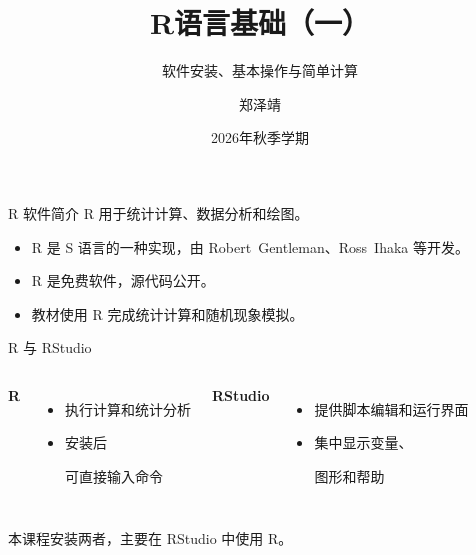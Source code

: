 \documentclass[14pt,compress,t,noamsthm,notheorem,table,handout,fontset=none]{ctexbeamer}
\title{R语言基础（一）}
\subtitle{软件安装、基本操作与简单计算}
\author{郑泽靖}
\institute{北京师范大学统计学院}
\date{2026年秋季学期}
\begin{document}
\begin{frame}[plain]
  \titlepage
\end{frame}


\begin{frame}{R 软件简介}
  R 用于统计计算、数据分析和绘图。
  \begin{itemize}
    \item R 是 S 语言的一种实现，由 \mbox{Robert Gentleman}、\mbox{Ross Ihaka} 等开发。
    \item R 是免费软件，源代码公开。
    \item 教材使用 R 完成统计计算和随机现象模拟。
  \end{itemize}
\end{frame}

\begin{frame}{R 与 RStudio}
  \setlength{\leftmargini}{1.2em}
  \begin{columns}[T,onlytextwidth]
      \textbf{R}
      \begin{itemize}
        \item 执行计算和\mbox{统计分析}
        \item 安装后\par 可直接输入命令
      \end{itemize}
      \textbf{RStudio}
      \begin{itemize}
        \item 提供脚本编辑和运行界面
        \item 集中显示变量、\par 图形和帮助
      \end{itemize}
  \end{columns}
  \vfill
  本课程安装两者，主要在 RStudio 中使用 R。
\end{frame}
\end{document}
